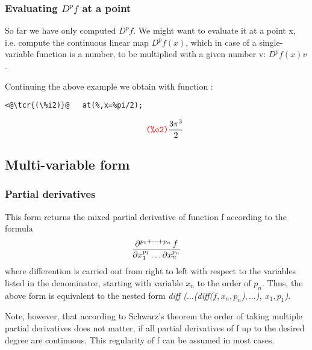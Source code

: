 \documentclass[../Maxima_Workbook.tex]{subfiles}
\begin{document}
\subsubsection{Evaluating $ D^pf $ at a point}

So far we have only computed $ D^pf $. We might want to evaluate it at a point x, i.e. compute the continuous linear map $ D^pf(x) $, which in case of a single-variable function is a number, to be multiplied with a given number v: $ D^pf(x)v $.

\lz Continuing the above example we obtain with function :

\lz \begin{small}
\color{blue} \leqn
\begin{lstlisting}
<@\tcr{(\%i2)}@   at(%,x=%pi/2);
\end{lstlisting}
\vspace{-6mm} \[\tag*{\tcr{\ttfamily (\%o2)}} \frac{3 \pi^3}{2} \]
\color{black} \reqn
\end{small} \vspace{-7mm} 

\subsection{Multi-variable form}

\subsubsection{Partial derivatives}\label{D1}

\lz {}

\lz This form returns the mixed partial derivative of function f according to the formula
\begin{equation*}
	\frac{\partial^{p_1+\dots+p_n } \, f}{\partial x_1^{p_1} \dots \partial x_n^{p_n}}
\end{equation*}
where differention is carried out from right to left with respect to the variables listed in the denominator, starting with variable $ x_n $ to the order of $ p_n $. Thus, the above form is equivalent to the nested form \emph{diff ($ \dots $(diff($ f,x_n,p_n $)$, \dots $), $ x_1,p_1 $)}.

\lz Note, however, that according to Schwarz's theorem the order of taking multiple partial derivatives does not matter, if all partial derivatives of f up to the desired degree are continuous. This regularity of f can be assumed in most cases.
\end{document}
